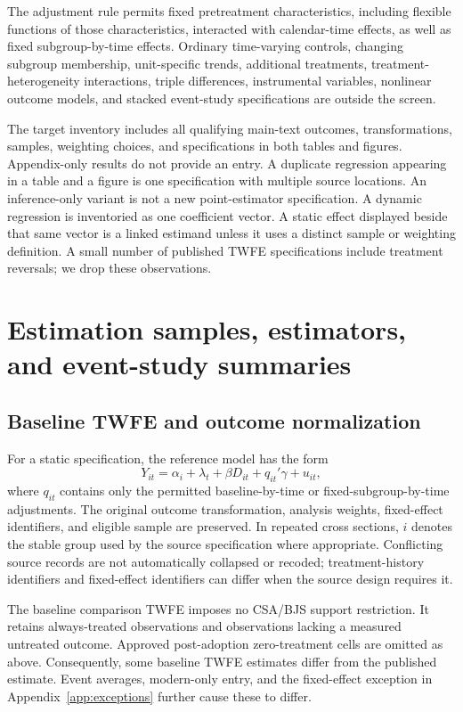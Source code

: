 \documentclass[11pt,letterpaper]{article}
\begin{document}
The adjustment rule permits fixed pretreatment characteristics, including flexible functions of those characteristics, interacted with calendar-time effects, as well as fixed subgroup-by-time effects. Ordinary time-varying controls, changing subgroup membership, unit-specific trends, additional treatments, treatment-heterogeneity interactions, triple differences, instrumental variables, nonlinear outcome models, and stacked event-study specifications are outside the screen. 

The target inventory includes all qualifying main-text outcomes, transformations, samples, weighting choices, and specifications in both tables and figures. Appendix-only results do not provide an entry. A duplicate regression appearing in a table and a figure is one specification with multiple source locations. An inference-only variant is not a new point-estimator specification. A dynamic regression is inventoried as one coefficient vector. A static effect displayed beside that same vector is a linked estimand unless it uses a distinct sample or weighting definition. A small number of published TWFE specifications include treatment reversals; we drop these observations. 




\section{Estimation samples, estimators, and event-study summaries}
\label{app:methods}

\subsection{Baseline TWFE and outcome normalization}
For a static specification, the reference model has the form
\begin{equation}
Y_{it}=\alpha_i+\lambda_t+\beta D_{it}+q_{it}'\gamma+u_{it},
\end{equation}
where $q_{it}$ contains only the permitted baseline-by-time or fixed-subgroup-by-time adjustments. The original outcome transformation, analysis weights, fixed-effect identifiers, and eligible sample are preserved. In repeated cross sections, $i$ denotes the stable group used by the source specification where appropriate. Conflicting source records are not automatically collapsed or recoded; treatment-history identifiers and fixed-effect identifiers can differ when the source design requires it.

The baseline comparison TWFE imposes no CSA/BJS support restriction. It retains always-treated observations and observations lacking a measured untreated outcome. Approved post-adoption zero-treatment cells are omitted as above. Consequently, some baseline TWFE estimates differ from the published estimate. Event averages, modern-only entry, and the fixed-effect exception in Appendix~\ref{app:exceptions} further cause these to differ.
\end{document}
